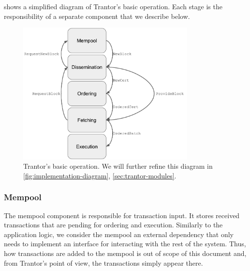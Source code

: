 \documentclass{article}
\begin{document}
 shows a simplified diagram of Trantor’s basic operation.
Each stage is the responsibility of a separate component that we describe below.


\begin{figure}[h]
    \centering
    \includegraphics[width=0.8\textwidth]{figures/basic-operation}
    \caption{Trantor's basic operation. We will further refine this diagram in \cref{fig:implementation-diagram}, \cref{sec:trantor-modules}.}
    \label{fig:basic-operation}
\end{figure}

\subsubsection{Mempool}
\label{sec:mempool}

The mempool component is responsible for transaction input.
It stores received transactions that are pending for ordering and execution.
Similarly to the application logic, we consider the mempool an external dependency
that only needs to implement an interface for interacting with the rest of the system.
Thus, how transactions are added to the mempool is out of scope of this document and,
from Trantor’s point of view, the transactions simply appear there.
\end{document}
